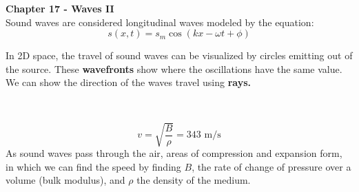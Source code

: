 \documentclass[11pt]{article}
\begin{document}
    \noindent \textbf{Chapter 17 - Waves II}
    \\ \noindent \newline Sound waves are considered longitudinal waves modeled by the equation:
    \begin{equation}
        s(x,t) = s_m\cos(kx - \omega t + \phi) \tag{sound equation}
    \end{equation}


    \noindent In 2D space, the travel of sound waves can be visualized by circles
    emitting out of the source.
    These \textbf{wavefronts} show where the oscillations have the same value.
    We can show the direction of the waves travel using \textbf{rays.}

    \\ \hfill
    \begin{minipage}[b]{0.3\textwidth}
    \end{minipage}
    \hfill
    \begin{minipage}[b] {0.6\textwidth}
        \begin{equation}
            v = \sqrt{\frac{B}{\rho}} = 343 \text{ m/s} \tag{speed of sound in air}\label{eq:soundSpeed}
        \end{equation}
        As sound waves pass through the air, areas of compression and expansion form,
        in which we can find the speed by finding $B$, the rate of change of pressure over a volume (bulk modulus),
        and $\rho$ the density of the medium.
    \end{minipage}
\end{document}

